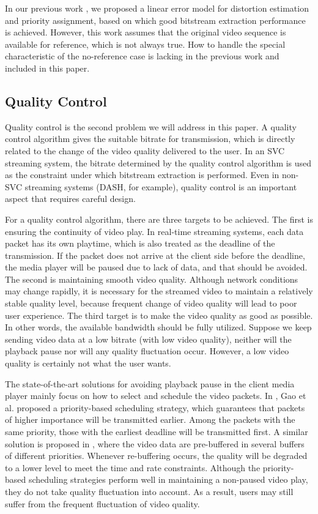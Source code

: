 \documentclass[journal]{IEEEtran}
\begin{document}
In our previous work \cite{Zhang12}, we proposed a linear error model for distortion estimation and priority assignment, based on which good bitstream extraction performance is achieved. However, this work assumes that the original video sequence is available for reference, which is not always true. How to handle the special characteristic of the no-reference case is lacking in the previous work and included in this paper.

\subsection{Quality Control}
\label{subsec:analysis-control}

Quality control is the second problem we will address in this paper. A quality control algorithm gives the suitable bitrate for transmission, which is directly related to the change of the video quality delivered to the user. In an SVC streaming system, the bitrate determined by the quality control algorithm is used as the constraint under which bitstream extraction is performed. Even in non-SVC streaming systems (DASH, for example), quality control is an important aspect that requires careful design.

For a quality control algorithm, there are three targets to be achieved. The first is ensuring the continuity of video play. In real-time streaming systems, each data packet has its own playtime, which is also treated as the deadline of the transmission. If the packet does not arrive at the client side before the deadline, the media player will be paused due to lack of data, and that should be avoided. The second is maintaining smooth video quality. Although network conditions may change rapidly, it is necessary for the streamed video to maintain a relatively stable quality level, because frequent change of video quality will lead to poor user experience. The third target is to make the video quality as good as possible. In other words, the available bandwidth should be fully utilized. Suppose we keep sending video data at a low bitrate (with low video quality), neither will the playback pause nor will any quality fluctuation occur. However, a low video quality is certainly not what the user wants.

The state-of-the-art solutions for avoiding playback pause in the client media player mainly focus on how to select and schedule the video packets. In \cite{Gao06}, Gao et al. proposed a priority-based scheduling strategy, which guarantees that packets of higher importance will be transmitted earlier. Among the packets with the same priority, those with the earliest deadline will be transmitted first. A similar solution is proposed in \cite{Schierl10}, where the video data are pre-buffered in several buffers of different priorities. Whenever re-buffering occurs, the quality will be degraded to a lower level to meet the time and rate constraints. Although the priority-based scheduling strategies perform well in maintaining a non-paused video play, they do not take quality fluctuation into account. As a result, users may still suffer from the frequent fluctuation of video quality.
\end{document}
